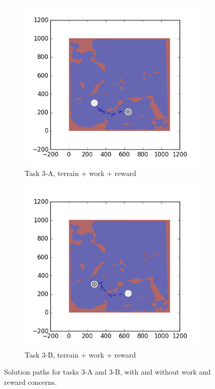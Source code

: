 \documentclass{tamuccthesis}
\begin{document}
\begin{figure}[H]
  \begin{subfigure}[b]{0.4\textwidth}
        \centering
        \includegraphics[width=\textwidth,trim={4cm 3cm 2cm 3cm},clip]{EXP3RG_PathCa_-1_-1_-1_-1.png}
        \caption{Task 3-A, terrain + work + reward}
        \label{fig:Path_3-A_terrain_work_reward}
    \end{subfigure}
    \hfill
    \begin{subfigure}[b]{0.4\textwidth}  
        \centering 
        \includegraphics[width=\textwidth,trim={4cm 3cm 2cm 3cm},clip]{EXP3RG_PathCb_-1_-1_-1_-1.png}
        \caption{Task 3-B, terrain + work + reward}
        \label{fig:Path_3-B_terrain_work_reward}
    \end{subfigure}

    \caption{Solution paths for tasks 3-A and 3-B, with and without work and reward concerns.} 
    \label{fig:Paths_3-A_3-B}
\end{figure}
\end{document}

